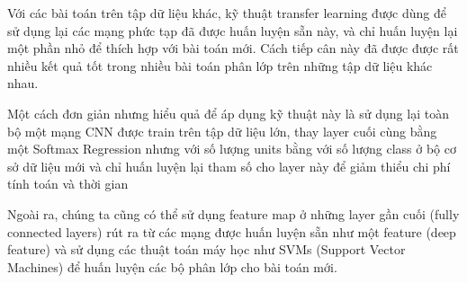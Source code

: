 Với các bài toán trên tập dữ liệu khác, kỹ thuật transfer learning được dùng để sử dụng lại các mạng phức tạp đã được huấn luyện sẵn này, và chỉ huấn luyện lại một phần nhỏ để thích hợp với bài toán mới. Cách tiếp cân này đã được được rất nhiều kết quả tốt trong nhiều bài toán phân lớp trên những tập dữ liệu khác nhau.

Một cách đơn giản nhưng hiểu quả để áp dụng kỹ thuật này là sử dụng lại toàn bộ một mạng CNN được train trên tập dữ liệu lớn, thay layer cuối cùng bằng một Softmax Regression nhưng với số lượng units bằng với số lượng class ở bộ cơ sở dữ liệu mới và chỉ huấn luyện lại tham số cho layer này để giảm thiểu chi phí tính toán và thời gian

Ngoài ra, chúng ta cũng có thể sử dụng feature map ở những layer gần cuối (fully connected layers) rút ra từ các mạng được huấn luyện sẵn như một feature (deep feature) và sử dụng các thuật toán máy học như SVMs (Support Vector Machines) để huấn luyện các bộ phân lớp cho bài toán mới.